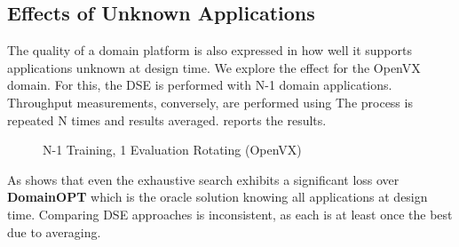 \subsection{Effects of Unknown Applications}
\label{sec:res:unknown}

The quality of a domain platform is also expressed in how well it supports applications unknown at design time. We explore the effect for the OpenVX domain. For this, the DSE is performed with N-1 domain applications. Throughput measurements, conversely, are performed using  The process is repeated N times and results averaged.  reports the results.

\begin{figure}[htb]
	\centering
		\hfill
	\caption{N-1 Training, 1 Evaluation Rotating (OpenVX)}
	\label{fig:unknown}
\end{figure}

As  shows that even the exhaustive search exhibits a significant loss over \textbf{DomainOPT} which is the oracle solution knowing all applications at design time. Comparing DSE approaches is inconsistent, as each is at least once the best due to averaging.  

